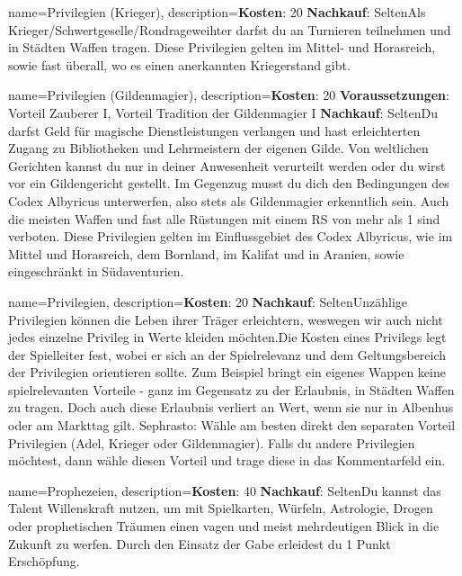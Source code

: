 {
    name={Privilegien (Krieger)},
    description={\textbf{Kosten}: 20 \textbf{Nachkauf}: Selten\newline Als Krieger/Schwertgeselle/Rondrageweihter darfst du an Turnieren teilnehmen und in Städten Waffen tragen. Diese Privilegien gelten im Mittel- und Horasreich, sowie fast überall, wo es einen anerkannten Kriegerstand gibt.}
}


{
    name={Privilegien (Gildenmagier)},
    description={\textbf{Kosten}: 20 \textbf{Voraussetzungen}: Vorteil Zauberer I, Vorteil Tradition der Gildenmagier I \textbf{Nachkauf}: Selten\newline Du darfst Geld für magische Dienstleistungen verlangen und hast erleichterten Zugang zu Bibliotheken und Lehrmeistern der eigenen Gilde. Von weltlichen Gerichten kannst du nur in deiner Anwesenheit verurteilt werden oder du wirst vor ein Gildengericht gestellt. Im Gegenzug musst du dich den Bedingungen des Codex Albyricus unterwerfen, also stets als Gildenmagier erkenntlich sein. Auch die meisten Waffen und fast alle Rüstungen mit einem RS von mehr als 1 sind verboten. Diese Privilegien gelten im Einflussgebiet des Codex Albyricus, wie im Mittel­ und Horasreich, dem Bornland, im Kalifat und in Aranien, sowie eingeschränkt in Südaventurien.}
}


{
    name={Privilegien},
    description={\textbf{Kosten}: 20 \textbf{Nachkauf}: Selten\newline Unzählige Privilegien können die Leben ihrer Träger erleichtern, weswegen wir auch nicht jedes einzelne Privileg in Werte kleiden möchten.\newline Die Kosten eines Privilegs legt der Spielleiter fest, wobei er sich an der Spielrelevanz und dem Geltungsbereich der Privilegien orientieren sollte. Zum Beispiel bringt ein eigenes Wappen keine spielrelevanten Vorteile - ganz im Gegensatz zu der Erlaubnis, in Städten Waffen zu tragen. Doch auch diese Erlaubnis verliert an Wert, wenn sie nur in Albenhus oder  am Markttag gilt. \newline Sephrasto: Wähle am besten direkt den separaten Vorteil Privilegien (Adel, Krieger oder Gildenmagier). Falls du andere Privilegien möchtest, dann wähle diesen Vorteil und trage diese in das Kommentarfeld ein.}
}


{
    name={Prophezeien},
    description={\textbf{Kosten}: 40 \textbf{Nachkauf}: Selten\newline Du kannst das Talent Willenskraft nutzen, um mit Spielkarten, Würfeln, Astrologie, Drogen oder prophetischen Träumen einen vagen und meist mehrdeutigen Blick in die Zukunft zu werfen. Durch den Einsatz der Gabe erleidest du 1 Punkt Erschöpfung.}
}


